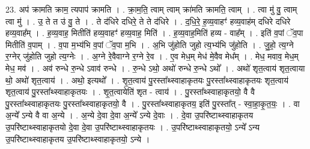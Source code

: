\documentclass[17pt]{extarticle}
\begin{document}
23. अप॑ क्रामति क्राम॒ त्यपाप॑ क्रामति । . क्रा॒म॒ति॒ त्वाम् त्वाम् क्रा॑मति क्रामति॒ त्वाम् । . त्वा मु॑ वु॒ त्वाम् त्वा मु॑ । . उ॒ ते त उ॑ वु॒ ते । . ते द॑धिरे दधिरे॒ ते ते द॑धिरे । . द॒धि॒रे॒ ह॒व्य॒वाहꣳ॑ हव्य॒वाह॑म् दधिरे दधिरे हव्य॒वाह᳚म् । . ह॒व्य॒वाह॒ मितीति॑ हव्य॒वाहꣳ॑ हव्य॒वाह॒ मिति॑ । . ह॒व्य॒वाह॒मिति॑ हव्य - वाह᳚म् । . इति॑ व॒पां ॅव॒पा मितीति॑ व॒पाम् । . व॒पा म॒भ्य॑भि व॒पां ॅव॒पा म॒भि । . अ॒भि जु॑होति जुहो त्य॒भ्य॑भि जु॑होति । . जु॒हो॒ त्य॒ग्ने र॒ग्नेर् जु॑होति जुहो त्य॒ग्नेः । . अ॒ग्ने रे॒वैवाग्ने र॒ग्ने रे॒व । . ए॒व मेध॒म् मेध॑ मे॒वैव मेध᳚म् । . मेध॒ मवाव॒ मेध॒म् मेध॒ मव॑ । . अव॑ रुन्धे रु॒न्धे ऽवाव॑ रुन्धे । . रु॒न्धे ऽथो॒ अथो॑ रुन्धे रु॒न्धे ऽथो᳚ । . अथो॑ शृत॒त्वाय॑ शृत॒त्वाया थो॒ अथो॑ शृत॒त्वाय॑ । . अथो॒ इत्यथो᳚ । . शृ॒त॒त्वाय॑ पु॒रस्ता᳚थ्स्वाहाकृतयः पु॒रस्ता᳚थ्स्वाहाकृतयः शृत॒त्वाय॑ शृत॒त्वाय॑ पु॒रस्ता᳚थ्स्वाहाकृतयः । . शृ॒त॒त्वायेति॑ शृत - त्वाय॑ । . पु॒रस्ता᳚थ्स्वाहाकृतयो॒ वै वै पु॒रस्ता᳚थ्स्वाहाकृतयः पु॒रस्ता᳚थ्स्वाहाकृतयो॒ वै । . पु॒रस्ता᳚थ्स्वाहाकृतय॒ इति॑ पु॒रस्ता᳚त् - स्वा॒हा॒कृ॒त॒यः॒ । . वा अ॒न्ये᳚ ऽन्ये वै वा अ॒न्ये । . अ॒न्ये दे॒वा दे॒वा अ॒न्ये᳚ ऽन्ये दे॒वाः । . दे॒वा उ॒परि॑ष्टाथ्स्वाहाकृतय उ॒परि॑ष्टाथ्स्वाहाकृतयो दे॒वा दे॒वा उ॒परि॑ष्टाथ्स्वाहाकृतयः । . उ॒परि॑ष्टाथ्स्वाहाकृतयो॒ ऽन्ये᳚ ऽन्य उ॒परि॑ष्टाथ्स्वाहाकृतय उ॒परि॑ष्टाथ्स्वाहाकृतयो॒ ऽन्ये । \newline
\end{document}
